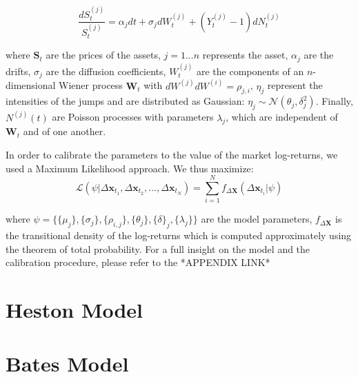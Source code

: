 \begin{equation}
\frac{dS_t^{(j)}}{S_t^{(j)}} = \alpha_j dt + \sigma_j dW_t^{(j)} + (Y^{(j)}_t -1) dN^{(j)}_t
\end{equation}

where $\mathbf{S}_t$ are the prices of the assets, $j = 1 ... n$ represents the asset, $\alpha_j$ are the drifts, $\sigma_j$ are the diffusion coefficients, $W^{(j)}_t$ are the components of an $n$-dimensional Wiener process $ \mathbf{W}_t$ with $dW^{(j)}dW^{(i)}=\rho_{j,i}$, $\eta_j$ represent the intensities of the jumps and are distributed as Gaussian: $\eta_j \sim \mathcal{N}(\theta_j , \delta_j^2)$. Finally, $N^{(j)}(t)$ are Poisson processes with parameters $\lambda_j$, which are independent of $\mathbf{W}_t$ and of one another. 

In order to calibrate the parameters to the value of the market log-returns, we used a Maximum Likelihood approach. We thus maximize:
\begin{equation}
\mathcal{L}(\psi | \Delta \mathbf{x}_{t_1},\Delta \mathbf{x}_{t_2},\dots,\Delta \mathbf{x}_{t_N}) = \sum_{i=1}^{N} f_{\Delta \mathbf{X}}(\Delta\mathbf{x}_{t_i} | \psi)
\end{equation}

where $\psi = \{ \{\mu_j\},\{\sigma_j\},\{\rho_{i,j}\},\{\theta_j\},\{\delta\}_j,\{\lambda_j\} \}$ are the model parameters, $f_{\Delta \mathbf{X}}$ is the transitional density of the log-returns which is computed approximately using the theorem of total probability.
For a full insight on the model and the calibration procedure, please refer to the *APPENDIX LINK*


\section{Heston Model}



\section{Bates Model}



